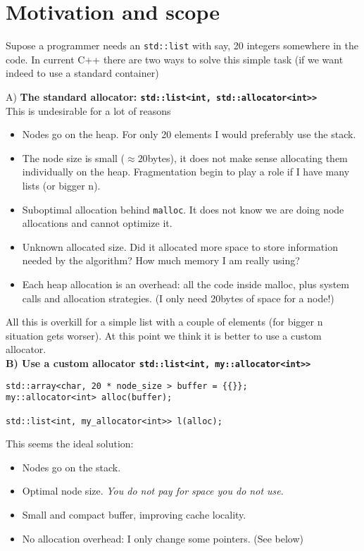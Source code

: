 \documentclass[11pt]{article}
\begin{document}
\section{Motivation and scope}

Supose a programmer needs an \texttt{std::list} with say, 20
integers somewhere in the code. In current C++ there are
two ways to solve this simple task (if we want indeed to use a standard
container)

\medskip
\medskip
\noindent
{A) \bf The standard allocator: \texttt{std::list<int, std::allocator<int>>}} \\

\medskip
This is undesirable for a lot of reasons
\begin{itemize}
\item Nodes go on the heap. For only 20 elements I would preferably
use the stack.
\item The node size is small ($\approx 20$bytes), it does not make sense allocating
them individually on the heap. Fragmentation begin to play a role
if I have many lists (or bigger n).
\item Suboptimal allocation behind \texttt{malloc}. It does not
know we are doing node allocations and cannot optimize it.
\item Unknown allocated size. Did it allocated more space to store information
needed by the algorithm? How much memory I am really using?
\item  Each heap allocation is an overhead: all the code inside malloc, plus
system calls and allocation strategies. (I only need 20bytes of space for a
node!)
\end{itemize}

All this is overkill for a simple list with a couple of elements
(for bigger n situation gets worser). At this point we think it is
better to use a custom allocator. \\

\medskip
\medskip
\noindent
{\bf B) Use a custom allocator \texttt{std::list<int, my::allocator<int>>}} \\

\medskip
\begin{lstlisting}
std::array<char, 20 * node_size > buffer = {{}};
my::allocator<int> alloc(buffer);

std::list<int, my_allocator<int>> l(alloc);
\end{lstlisting}

This seems the ideal solution:
\begin{itemize}
\item Nodes go on the stack.
\item Optimal node size. {\it You do not pay for space you do not use}.
\item Small and compact buffer, improving cache locality.
\item No allocation overhead: I only change some pointers. (See below)
\end{itemize}
\end{document}
